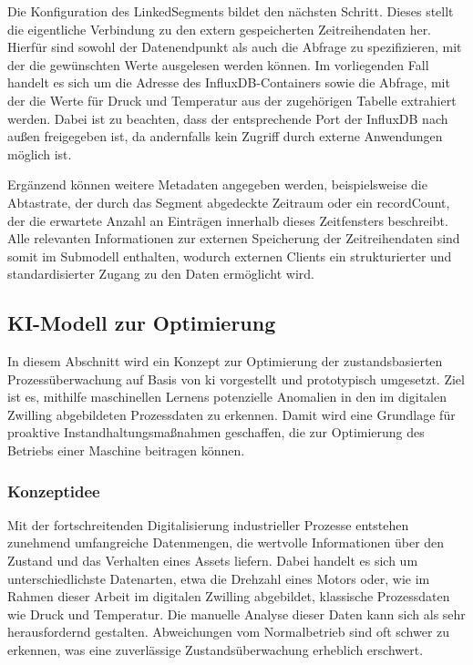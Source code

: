 Die Konfiguration des LinkedSegments bildet den nächsten Schritt.
Dieses stellt die eigentliche Verbindung zu den extern gespeicherten Zeitreihendaten her. 
Hierfür sind sowohl der Datenendpunkt als auch die Abfrage zu spezifizieren, mit der die gewünschten Werte ausgelesen werden können. 
Im vorliegenden Fall handelt es sich um die Adresse des InfluxDB-Containers sowie die Abfrage, mit der die Werte für Druck und Temperatur aus der zugehörigen Tabelle extrahiert werden. 
Dabei ist zu beachten, dass der entsprechende Port der InfluxDB nach außen freigegeben ist, da andernfalls kein Zugriff durch externe Anwendungen möglich ist.

Ergänzend können weitere Metadaten angegeben werden, beispielsweise die Abtastrate, der durch das Segment abgedeckte Zeitraum oder ein recordCount, der die erwartete Anzahl an Einträgen innerhalb dieses Zeitfensters beschreibt.
Alle relevanten Informationen zur externen Speicherung der Zeitreihendaten sind somit im Submodell enthalten, wodurch externen Clients ein strukturierter und standardisierter Zugang zu den Daten ermöglicht wird.

\newpage
\subsection{KI-Modell zur Optimierung}
In diesem Abschnitt wird ein Konzept zur Optimierung der zustandsbasierten Prozessüberwachung auf Basis von \acs{ki} vorgestellt und prototypisch umgesetzt.
Ziel ist es, mithilfe maschinellen Lernens potenzielle Anomalien in den im digitalen Zwilling abgebildeten Prozessdaten zu erkennen.
Damit wird eine Grundlage für proaktive Instandhaltungsmaßnahmen geschaffen, die zur Optimierung des Betriebs einer Maschine beitragen können.



\subsubsection{Konzeptidee}
Mit der fortschreitenden Digitalisierung industrieller Prozesse entstehen zunehmend umfangreiche Datenmengen, die wertvolle Informationen über den Zustand und das Verhalten eines Assets liefern. 
Dabei handelt es sich um unterschiedlichste Datenarten, etwa die Drehzahl eines Motors oder, wie im Rahmen dieser Arbeit im digitalen Zwilling abgebildet, klassische Prozessdaten wie Druck und Temperatur.
Die manuelle Analyse dieser Daten kann sich als sehr herausfordernd gestalten. Abweichungen vom Normalbetrieb sind oft schwer zu erkennen, was eine zuverlässige Zustandsüberwachung erheblich erschwert.

